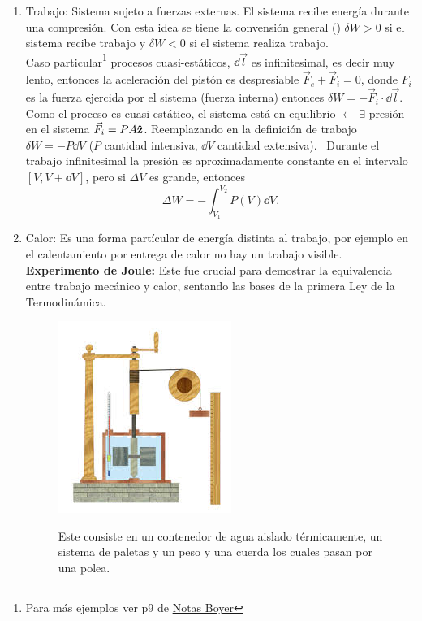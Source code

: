 \begin{enumerate}
	\item Trabajo: Sistema sujeto a fuerzas externas. El sistema recibe energía durante una compresión. Con esta idea se tiene la convensión general () $\delta W > 0$ si el sistema recibe trabajo y $\delta W < 0$ si el sistema realiza trabajo. \\
	Caso particular\footnote{Para más ejemplos ver p9 de \href{https://github.com/DSarceno/ExamenPrivado/blob/main/material_\%C3\%BAtil/termodinamica/Notas\%20Boyer.pdf}{Notas Boyer}} procesos cuasi-estáticos, $\dd{\vec{l}}$ es infinitesimal, es decir muy lento, entonces la aceleración del pistón es despresiable $\vec{F} _e + \vec{F}_i = 0$, donde $F_i$ es la fuerza ejercida por el sistema (fuerza interna) entonces $\delta W = - \vec{F} _i \cdot \dd{\vec{l}}$. Como el proceso es cuasi-estático, el sistema está en equilibrio $\leftarrow \, \exists$ presión en el sistema $\vec{F} _i = PA \vu{z}$. Reemplazando en la definición de trabajo $\delta W = -P\dd{V}$ ($P$ cantidad intensiva, $\dd{V}$ cantidad extensiva). \faExclamationTriangle $\,$ Durante el trabajo infinitesimal la presión es aproximadamente constante en el intervalo $[V,V + \dd{V}]$, pero si $\Delta V$ es grande, entonces
		$$ \Delta W = - \int _{V_1} ^{V_2} P(V) \dd{V}. $$
	\item Calor: Es una forma partícular de energía distinta al trabajo, por ejemplo en el calentamiento por entrega de calor no hay un trabajo visible. \\
	\textbf{Experimento de Joule: } Este fue crucial para demostrar la equivalencia entre trabajo mecánico y calor, sentando las bases de la primera Ley de la Termodinámica. 
	\begin{figure}[H]
		\centering
		\includegraphics[scale=0.4]{./img/experimentoJoule.jpeg}
		\label{expJoule}
		\caption{Este consiste en un contenedor de agua aislado térmicamente, un sistema de paletas y un peso y una cuerda los cuales pasan por una polea.}

\end{figure}
\end{enumerate}
